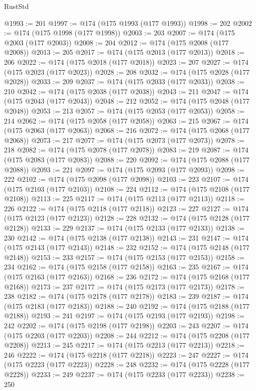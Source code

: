 \begin{lexlean}{RustStd}
\begin{coremodule}
@1993 := 201
@1997 := @174 (@175 @1993 (@177 @1993))
@1998 := 202
@2002 := @174 (@175 @1998 (@177 @1998))
@2003 := 203
@2007 := @174 (@175 @2003 (@177 @2003))
@2008 := 204
@2012 := @174 (@175 @2008 (@177 @2008))
@2013 := 205
@2017 := @174 (@175 @2013 (@177 @2013))
@2018 := 206
@2022 := @174 (@175 @2018 (@177 @2018))
@2023 := 207
@2027 := @174 (@175 @2023 (@177 @2023))
@2028 := 208
@2032 := @174 (@175 @2028 (@177 @2028))
@2033 := 209
@2037 := @174 (@175 @2033 (@177 @2033))
@2038 := 210
@2042 := @174 (@175 @2038 (@177 @2038))
@2043 := 211
@2047 := @174 (@175 @2043 (@177 @2043))
@2048 := 212
@2052 := @174 (@175 @2048 (@177 @2048))
@2053 := 213
@2057 := @174 (@175 @2053 (@177 @2053))
@2058 := 214
@2062 := @174 (@175 @2058 (@177 @2058))
@2063 := 215
@2067 := @174 (@175 @2063 (@177 @2063))
@2068 := 216
@2072 := @174 (@175 @2068 (@177 @2068))
@2073 := 217
@2077 := @174 (@175 @2073 (@177 @2073))
@2078 := 218
@2082 := @174 (@175 @2078 (@177 @2078))
@2083 := 219
@2087 := @174 (@175 @2083 (@177 @2083))
@2088 := 220
@2092 := @174 (@175 @2088 (@177 @2088))
@2093 := 221
@2097 := @174 (@175 @2093 (@177 @2093))
@2098 := 222
@2102 := @174 (@175 @2098 (@177 @2098))
@2103 := 223
@2107 := @174 (@175 @2103 (@177 @2103))
@2108 := 224
@2112 := @174 (@175 @2108 (@177 @2108))
@2113 := 225
@2117 := @174 (@175 @2113 (@177 @2113))
@2118 := 226
@2122 := @174 (@175 @2118 (@177 @2118))
@2123 := 227
@2127 := @174 (@175 @2123 (@177 @2123))
@2128 := 228
@2132 := @174 (@175 @2128 (@177 @2128))
@2133 := 229
@2137 := @174 (@175 @2133 (@177 @2133))
@2138 := 230
@2142 := @174 (@175 @2138 (@177 @2138))
@2143 := 231
@2147 := @174 (@175 @2143 (@177 @2143))
@2148 := 232
@2152 := @174 (@175 @2148 (@177 @2148))
@2153 := 233
@2157 := @174 (@175 @2153 (@177 @2153))
@2158 := 234
@2162 := @174 (@175 @2158 (@177 @2158))
@2163 := 235
@2167 := @174 (@175 @2163 (@177 @2163))
@2168 := 236
@2172 := @174 (@175 @2168 (@177 @2168))
@2173 := 237
@2177 := @174 (@175 @2173 (@177 @2173))
@2178 := 238
@2182 := @174 (@175 @2178 (@177 @2178))
@2183 := 239
@2187 := @174 (@175 @2183 (@177 @2183))
@2188 := 240
@2192 := @174 (@175 @2188 (@177 @2188))
@2193 := 241
@2197 := @174 (@175 @2193 (@177 @2193))
@2198 := 242
@2202 := @174 (@175 @2198 (@177 @2198))
@2203 := 243
@2207 := @174 (@175 @2203 (@177 @2203))
@2208 := 244
@2212 := @174 (@175 @2208 (@177 @2208))
@2213 := 245
@2217 := @174 (@175 @2213 (@177 @2213))
@2218 := 246
@2222 := @174 (@175 @2218 (@177 @2218))
@2223 := 247
@2227 := @174 (@175 @2223 (@177 @2223))
@2228 := 248
@2232 := @174 (@175 @2228 (@177 @2228))
@2233 := 249
@2237 := @174 (@175 @2233 (@177 @2233))
@2238 := 250

\end{coremodule}
\end{lexlean}
